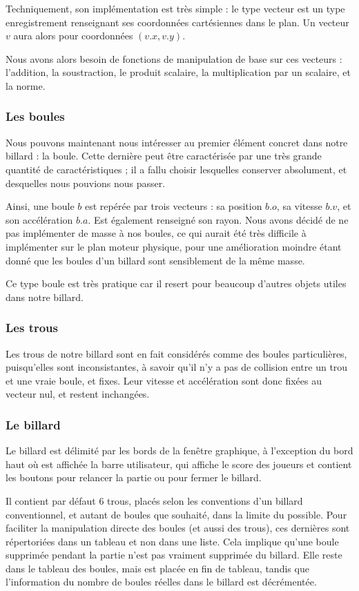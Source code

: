 \documentclass[a4paper,11pt]{article}
\begin{document}
Techniquement, son implémentation est très simple : le type vecteur est un type enregistrement
renseignant ses coordonnées cartésiennes dans le plan. Un vecteur $v$ aura alors pour coordonnées 
$(v.x,v.y)$.

Nous avons alors besoin de fonctions de manipulation de base sur ces vecteurs : l'addition, la soustraction,
le produit scalaire, la multiplication par un scalaire, et la norme.

\subsubsection{Les boules}
Nous pouvons maintenant nous intéresser au premier élément concret dans notre billard : la boule.
Cette dernière peut être caractérisée par une très grande quantité de caractéristiques ; il a fallu
choisir lesquelles conserver absolument, et desquelles nous pouvions nous passer.

Ainsi, une boule $b$ est repérée par trois vecteurs : sa position $b.o$, sa vitesse $b.v$, et son accélération $b.a$. 
Est également renseigné son rayon. Nous avons décidé de ne pas implémenter de masse à nos boules,
ce qui aurait été très difficile à implémenter sur le plan moteur physique, pour une amélioration
moindre étant donné que les boules d'un billard sont sensiblement de la même masse.

Ce type boule est très pratique car il resert pour beaucoup d'autres objets utiles dans notre billard.

\subsubsection{Les trous}
Les trous de notre billard sont en fait considérés comme des boules particulières, puisqu'elles sont
inconsistantes, à savoir qu'il n'y a pas de collision entre un trou et une vraie boule, et fixes. 
Leur vitesse et accélération sont donc fixées au vecteur nul, et restent inchangées.

\subsubsection{Le billard}
Le billard est délimité par les bords de la fenêtre graphique, à l'exception du bord haut où est affichée
la barre utilisateur, qui affiche le score des joueurs et contient les boutons pour relancer la partie
ou pour fermer le billard.

Il contient par défaut 6 trous, placés selon les conventions d'un billard conventionnel, et autant
de boules que souhaité, dans la limite du possible. Pour faciliter la manipulation directe des boules
(et aussi des trous), ces dernières sont répertoriées dans un tableau et non dans une liste. Cela
implique qu'une boule supprimée pendant la partie n'est pas vraiment supprimée du billard. Elle reste
dans le tableau des boules, mais est placée en fin de tableau, tandis que l'information du nombre de
boules réelles dans le billard est décrémentée. 
\end{document}
